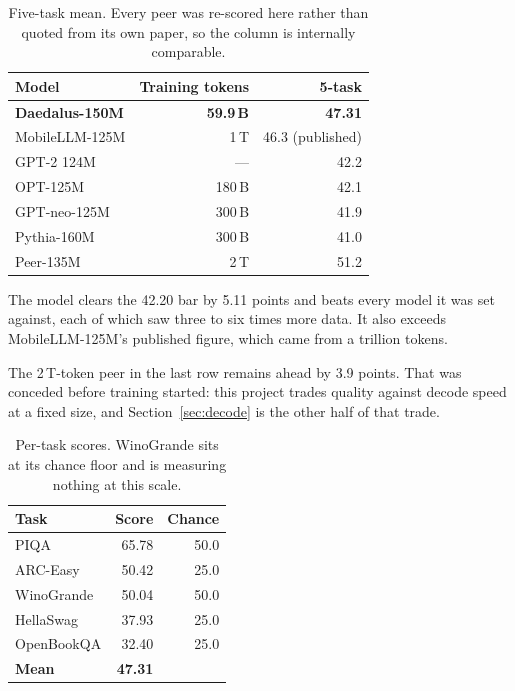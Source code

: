 \documentclass[conference]{IEEEtran}
\begin{document}
\begin{table}[t]
\caption{Five-task mean. Every peer was re-scored here rather than quoted from
its own paper, so the column is internally comparable.}
\label{tab:final}
\centering
\begin{tabular}{@{}lrr@{}}
\toprule
\textbf{Model} & \textbf{Training tokens} & \textbf{5-task} \\
\midrule
\textbf{Daedalus-150M} & \textbf{59.9\,B} & \textbf{47.31} \\
MobileLLM-125M   & 1\,T   & 46.3 (published) \\
GPT-2 124M       & ---    & 42.2 \\
OPT-125M         & 180\,B & 42.1 \\
GPT-neo-125M     & 300\,B & 41.9 \\
Pythia-160M      & 300\,B & 41.0 \\
\midrule
Peer-135M        & 2\,T   & 51.2 \\
\bottomrule
\end{tabular}
\end{table}

The model clears the 42.20 bar by 5.11 points and beats every model it was set
against, each of which saw three to six times more data. It also exceeds
MobileLLM-125M's published figure, which came from a trillion tokens.

The 2\,T-token peer in the last row remains ahead by 3.9 points. That was
conceded before training started: this project trades quality against decode
speed at a fixed size, and Section~\ref{sec:decode} is the other half of that
trade.

\begin{table}[t]
\caption{Per-task scores. WinoGrande sits at its chance floor and is measuring
nothing at this scale.}
\label{tab:pertask}
\centering
\begin{tabular}{@{}lrr@{}}
\toprule
\textbf{Task} & \textbf{Score} & \textbf{Chance} \\
\midrule
PIQA        & 65.78 & 50.0 \\
ARC-Easy    & 50.42 & 25.0 \\
WinoGrande  & 50.04 & 50.0 \\
HellaSwag   & 37.93 & 25.0 \\
OpenBookQA  & 32.40 & 25.0 \\
\midrule
\textbf{Mean} & \textbf{47.31} & \\
\bottomrule
\end{tabular}
\end{table}
\end{document}
